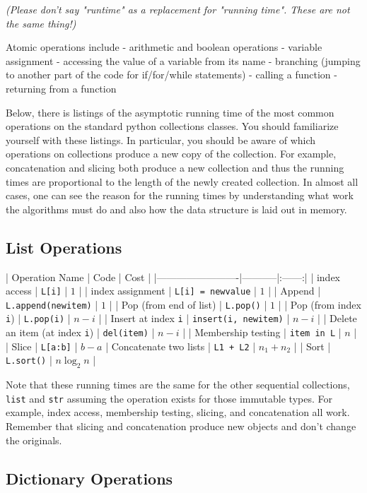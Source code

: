 \emph{(Please don't say "runtime" as a replacement for "running time".  These are not the same thing!)}


Atomic operations include
 - arithmetic and boolean operations
 - variable assignment
 - accessing the value of a variable from its name
 - branching (jumping to another part of the code for if/for/while statements)
 - calling a function
 - returning from a function


Below, there is listings of the asymptotic running time of the most common operations on the standard python collections classes.
You should familiarize yourself with these listings.
In particular, you should be aware of which operations on collections produce a new copy of the collection.
For example, concatenation and slicing both produce a new collection and thus the running times are proportional to the length of the newly created collection.
In almost all cases, one can see the reason for the running times by understanding what work the algorithms must do and also how the data structure is laid out in memory.

\subsection{List Operations}


| Operation Name          | Code      | Cost |
|-------------------------|-----------|:------:|
| index access            | \texttt{L[i]} | $1$ |
| index assignment        | \texttt{L[i] = newvalue} | $1$ |
| Append                  | \texttt{L.append(newitem)} | $1$ |
| Pop (from end of list)  | \texttt{L.pop()} | $1$ |
| Pop (from index \texttt{i})    | \texttt{L.pop(i)}  | $n - i$ |
| Insert at index \texttt{i}     | \texttt{insert(i, newitem)} |  $n-i$ |
| Delete an item (at index \texttt{i}) | \texttt{del(item)} | $n - i$ |
| Membership testing      | \texttt{item in L} | $n$ |
| Slice                   | \texttt{L[a:b]} | $b-a$
| Concatenate two lists   | \texttt{L1 + L2} | $n_1 + n_2$ |
| Sort                    | \texttt{L.sort()} | $n \log_2 n$ |


Note that these running times are the same for the other sequential collections, \texttt{list} and \texttt{str} assuming the operation exists for those immutable types.
For example, index access, membership testing, slicing, and concatenation all work.
Remember that slicing and concatenation produce new objects and don't change the originals.

\subsection{Dictionary Operations}


